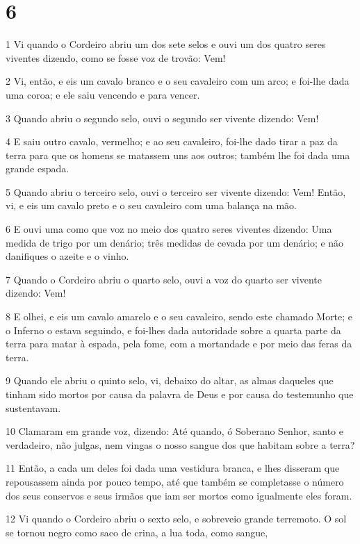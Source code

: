 \chapter{6}

\par 1 Vi quando o Cordeiro abriu um dos sete selos e ouvi um dos quatro seres viventes dizendo, como se fosse voz de trovão: Vem!
\par 2 Vi, então, e eis um cavalo branco e o seu cavaleiro com um arco; e foi-lhe dada uma coroa; e ele saiu vencendo e para vencer.
\par 3 Quando abriu o segundo selo, ouvi o segundo ser vivente dizendo: Vem!
\par 4 E saiu outro cavalo, vermelho; e ao seu cavaleiro, foi-lhe dado tirar a paz da terra para que os homens se matassem uns aos outros; também lhe foi dada uma grande espada.
\par 5 Quando abriu o terceiro selo, ouvi o terceiro ser vivente dizendo: Vem! Então, vi, e eis um cavalo preto e o seu cavaleiro com uma balança na mão.
\par 6 E ouvi uma como que voz no meio dos quatro seres viventes dizendo: Uma medida de trigo por um denário; três medidas de cevada por um denário; e não danifiques o azeite e o vinho.
\par 7 Quando o Cordeiro abriu o quarto selo, ouvi a voz do quarto ser vivente dizendo: Vem!
\par 8 E olhei, e eis um cavalo amarelo e o seu cavaleiro, sendo este chamado Morte; e o Inferno o estava seguindo, e foi-lhes dada autoridade sobre a quarta parte da terra para matar à espada, pela fome, com a mortandade e por meio das feras da terra.
\par 9 Quando ele abriu o quinto selo, vi, debaixo do altar, as almas daqueles que tinham sido mortos por causa da palavra de Deus e por causa do testemunho que sustentavam.
\par 10 Clamaram em grande voz, dizendo: Até quando, ó Soberano Senhor, santo e verdadeiro, não julgas, nem vingas o nosso sangue dos que habitam sobre a terra?
\par 11 Então, a cada um deles foi dada uma vestidura branca, e lhes disseram que repousassem ainda por pouco tempo, até que também se completasse o número dos seus conservos e seus irmãos que iam ser mortos como igualmente eles foram.
\par 12 Vi quando o Cordeiro abriu o sexto selo, e sobreveio grande terremoto. O sol se tornou negro como saco de crina, a lua toda, como sangue,
